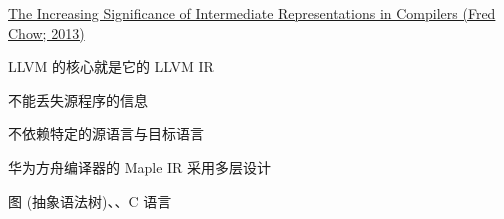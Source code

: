 
\begin{frame}{}
  \begin{center}
  \end{center}
\end{frame}

\begin{frame}{}
  \begin{center}
    \href{https://dl.acm.org/doi/pdf/10.1145/2542661.2544374}{The Increasing Significance of Intermediate Representations in Compilers (Fred Chow; 2013)}
  \end{center}
\end{frame}

\begin{frame}{}
  \begin{center}
    LLVM 的核心就是它的 LLVM IR

    \vspace{0.60cm}
  \end{center}
\end{frame}


\begin{frame}{}
  \begin{center}

    \vspace{1.00cm}
     不能丢失源程序的信息

    \vspace{0.30cm}
     不依赖特定的源语言与目标语言
    \vspace{0.20cm}

  \end{center}
\end{frame}

\begin{frame}{}
  \begin{center}
    华为方舟编译器的 Maple IR 采用多层设计
  \end{center}
\end{frame}

\begin{frame}{}
  \begin{center}

    \vspace{0.80cm}
    图 (抽象语法树)、、C 语言
  \end{center}
\end{frame}
